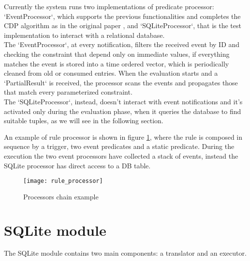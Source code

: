 Currently the system runs two implementations of predicate processor: `EventProcessor`, which supports the previous functionalities and completes the CDP algorithm as in the original paper \cite{trex-cuda}, and `SQLiteProcessor`, that is the test implementation to interact with a relational database.\\
The `EventProcessor`, at every notification, filters the received event by ID and checking the constraint that depend only on immediate values, if everything matches the event is stored into a time ordered vector, which is periodically cleaned from old or consumed entries. When the evaluation starts and a `PartialResult` is received, the processor scans the events and propagates those that match every parameterized constraint.\\
The `SQLiteProcessor`, instead, doesn't interact with event notifications and it's activated only during the evaluation phase, when it queries the database to find suitable tuples, as we will see in the following section.

An example of rule processor is shown in figure \ref{fig:rule_processor}, where the rule is composed in sequence by a trigger, two event predicates and a static predicate. During the execution the two event processors have collected a stack of events, instead the SQLite processor has direct access to a DB table.

\begin{figure}[h]
  \centering
  \texttt{[image: rule\_processor]}
  \caption{Processors chain example}
  \label{fig:rule_processor}
\end{figure}

\section{SQLite module}
The SQLite module contains two main components: a translator and an executor.

